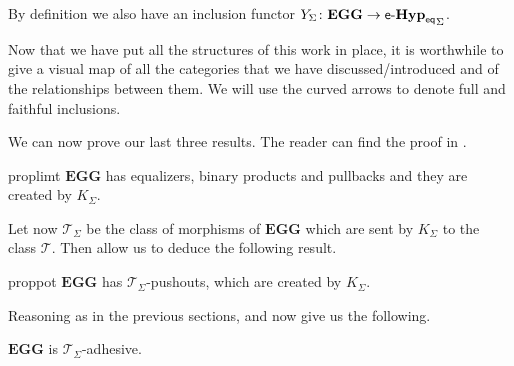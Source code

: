 \documentclass[3p]{elsarticle}
\newcommand{\eq}{\mathsf{eq}}
\newcommand{\eg}[0]{\mathbf{EGG}}
\newcommand{\catname}[1]{\textbf{\textup{#1}}}
\newcommand{\hyp}{\catname{Hyp}}
\newcommand{\EqHyp}{\catname{Hyp}_{\mathsf{eq}}} %
\newcommand{\EqHyps}{\catname{Hyp}_{\mathsf{eq}, \mathcal{G}}}
\newcommand{\EqTG}{\catname{EqTG}}
\newcommand{\tg}[0]{\catname{TG}_{\Sigma}}
\newcommand{\egg}{\mathsf{e}\text{-}\catname{Hyp}_\eq}
\theoremstyle{remark}
\theoremstyle{definition}
\begin{document}
\begin{rem}
	By definition we also have an inclusion functor $Y_\Sigma\colon \eg\to {\egg}_\Sigma$.
\end{rem}

\noindent 
\begin{minipage}[l]{.58\linewidth}
	\begin{rem}
		Now that we have put all the structures of this work in place, it is worthwhile to give a visual map of all the categories that we have discussed/introduced and of the relationships between them. We will use the curved arrows to denote full and faithful inclusions.
	\end{rem}
\end{minipage}\hfill
\iffalse \begin{minipage}[r]{.20\linewidth}
	\xymatrix@R=10pt@C=20pt{\eg \ar@{^{(}->}[r]^-{Y_\Sigma} \ar@{^{(}->}[d]_{K_\Sigma} & \egg_\Sigma \ar@{^{(}->}[d]^{Z_\Sigma} \ar[r]^{W_\Sigma}& \egg \ar@{^{(}->}[d]^{I}\\ \EqTG_{\Sigma} \ar@{^{(}->}[r]^-{J_\Sigma}\ar[d]_{S_\Sigma}& \EqHyps \ar[r]^-{V_\Sigma} \ar[d]_{T_\Sigma}& \EqHyp \ar[d]^{T}\\ \tg \ar@{^{(}->}[r]^-{I_\Sigma}& \hyp_{\Sigma} \ar[r]^-{U_\Sigma}  &\hyp}
\end{minipage}
\fi 
We can now prove our last three results. The reader can find the proof in .

\begin{restatable}{prop}{limt}\label{prop:limt}
	$\eg$ has equalizers, binary products and pullbacks and they are created by $K_\Sigma$.
\end{restatable}

Let now $\mathcal{T}_\Sigma$ be the class of morphisms of $\eg$ which are sent by $K_\Sigma$ to the class $\mathcal{T}$. Then  allow us to deduce the following result.

\begin{restatable}{prop}{pot}\label{prop:pot}
	$\eg$ has $\mathcal{T}_\Sigma$-pushouts, which are created by $K_\Sigma$.
\end{restatable}

Reasoning as in the previous sections,  and  now give us the following. 

\begin{cor}
$\eg$ is $\mathcal{T}_\Sigma$-adhesive.
\end{cor}
\fi 
\end{document}
